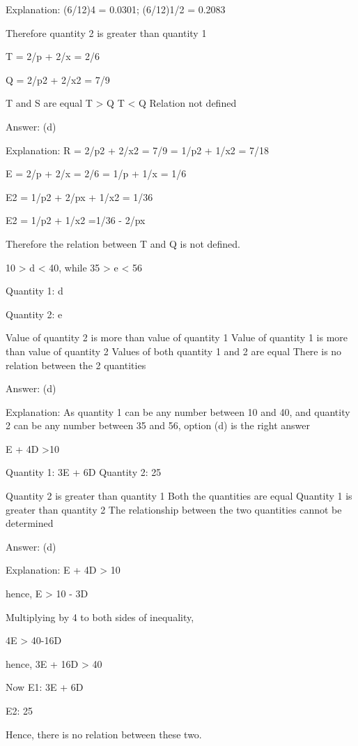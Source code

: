     Explanation: (6/12)4 = 0.0301; (6/12)1/2 = 0.2083

    Therefore quantity 2 is greater than quantity 1

    T = 2/p + 2/x = 2/6

    Q = 2/p2 + 2/x2 = 7/9

        T and S are equal
        T > Q
        T < Q
        Relation not defined

    Answer: (d)

    Explanation: R = 2/p2 + 2/x2 = 7/9 = 1/p2 + 1/x2 = 7/18

    E = 2/p + 2/x = 2/6 = 1/p + 1/x = 1/6

    E2 = 1/p2 + 2/px + 1/x2 = 1/36

    E2 = 1/p2 + 1/x2 =1/36 - 2/px

    Therefore the relation between T and Q is not defined.

    10 > d < 40, while 35 > e < 56

    Quantity 1: d

    Quantity 2: e

        Value of quantity 2 is more than value of quantity 1
        Value of quantity 1 is more than value of quantity 2
        Values of both quantity 1 and 2 are equal
        There is no relation between the 2 quantities

    Answer: (d)

    Explanation: As quantity 1 can be any number between 10 and 40, and quantity 2 can be any number between 35 and 56, option (d) is the right answer

    E + 4D >10

    Quantity 1: 3E + 6D Quantity 2: 25

        Quantity 2 is greater than quantity 1
        Both the quantities are equal
        Quantity 1 is greater than quantity 2
        The relationship between the two quantities cannot be determined

    Answer: (d)

    Explanation:  E + 4D > 10

    hence, E > 10 - 3D

    Multiplying by 4 to both sides of inequality,

    4E > 40-16D

    hence, 3E + 16D > 40

    Now E1: 3E + 6D

    E2: 25

    Hence, there is no relation between these two.


